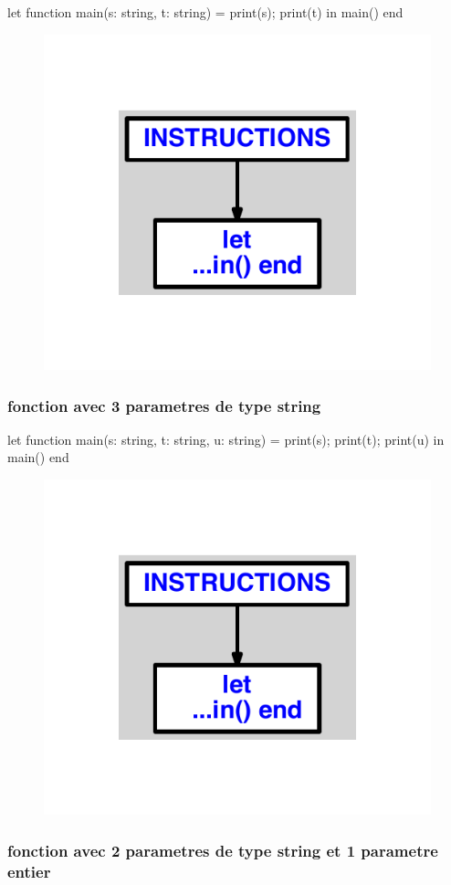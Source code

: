 \documentclass{article}
\begin{document}
\begin{verbatimtab}
let
	function main(s: string, t: string) =
		print(s);
		print(t)
in main() end
\end{verbatimtab}
\begin{figure}[H]\centering\includegraphics[max width=\textwidth]{ast/ast_232.pdf}\end{figure}\subsubsection{fonction avec 3 parametres de type string}
\begin{verbatimtab}
let
	function main(s: string, t: string, u: string) =
		print(s);
		print(t);
		print(u)
in main() end
\end{verbatimtab}
\begin{figure}[H]\centering\includegraphics[max width=\textwidth]{ast/ast_233.pdf}\end{figure}\subsubsection{fonction avec 2 parametres de type string et 1 parametre entier}
\end{document}
